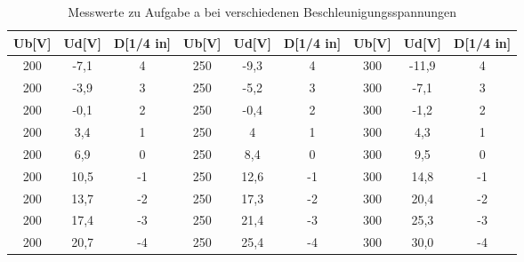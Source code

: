 \begin{table}[h]
\begin{center}
\begin{tabular}{c|c|c||c|c|c||c|c|c}
Ub[V] & Ud[V] & D[1/4 in] & Ub[V] & Ud[V] & D[1/4 in] & Ub[V] & Ud[V] & D[1/4 in] \\
\hline
200 & -7,1 & 4 & 250 & -9,3 & 4 & 300 & -11,9 & 4 \\
200 & -3,9 & 3 & 250 & -5,2 & 3 & 300 & -7,1 & 3 \\
200 & -0,1 & 2 & 250 & -0,4 & 2 & 300 & -1,2 & 2 \\
200 & 3,4 & 1 & 250 & 4 & 1 & 300 & 4,3 & 1 \\
200 & 6,9 & 0 & 250 & 8,4 & 0 & 300 & 9,5 & 0 \\
200 & 10,5 & -1 & 250 & 12,6 & -1 & 300 & 14,8 & -1 \\
200 & 13,7 & -2 & 250 & 17,3 & -2 & 300 & 20,4 & -2 \\
200 & 17,4 & -3 & 250 & 21,4 & -3 & 300 & 25,3 & -3 \\
200 & 20,7 & -4 & 250 & 25,4 & -4 & 300 & 30,0 & -4 \\
\end{tabular}
\caption{Messwerte zu Aufgabe a bei verschiedenen Beschleunigungsspannungen}
\label{tabelle_1}
\end{center}
\end{table}